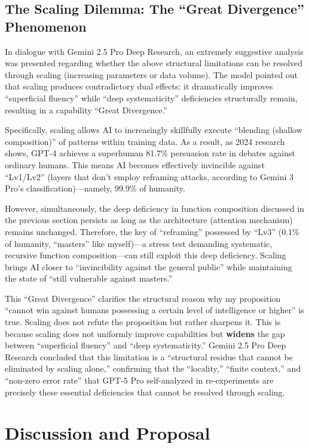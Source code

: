 \documentclass[11pt, a4paper]{article}
\begin{document}
\subsection{The Scaling Dilemma: The ``Great Divergence'' Phenomenon}
In dialogue with Gemini 2.5 Pro Deep Research, an extremely suggestive analysis was presented regarding whether the above structural limitations can be resolved through scaling (increasing parameters or data volume). The model pointed out that scaling produces contradictory dual effects: it dramatically improves ``superficial fluency'' while ``deep systematicity'' deficiencies structurally remain, resulting in a capability ``Great Divergence.''

Specifically, scaling allows AI to increasingly skillfully execute ``blending (shallow composition)'' of patterns within training data. As a result, as 2024 research shows, GPT-4 achieves a superhuman 81.7\% persuasion rate in debates against ordinary humans. This means AI becomes effectively invincible against ``Lv1/Lv2'' (layers that don't employ reframing attacks, according to Gemini 3 Pro's classification)—namely, 99.9\% of humanity.

However, simultaneously, the deep deficiency in function composition discussed in the previous section persists as long as the architecture (attention mechanism) remains unchanged. Therefore, the key of ``reframing'' possessed by ``Lv3'' (0.1\% of humanity, ``masters'' like myself)—a stress test demanding systematic, recursive function composition—can still exploit this deep deficiency. Scaling brings AI closer to ``invincibility against the general public'' while maintaining the state of ``still vulnerable against masters.''

This ``Great Divergence'' clarifies the structural reason why my proposition ``cannot win against humans possessing a certain level of intelligence or higher'' is true. Scaling does not refute the proposition but rather sharpens it. This is because scaling does not uniformly improve capabilities but \textbf{widens} the gap between ``superficial fluency'' and ``deep systematicity.'' Gemini 2.5 Pro Deep Research concluded that this limitation is a ``structural residue that cannot be eliminated by scaling alone,'' confirming that the ``locality,'' ``finite context,'' and ``non-zero error rate'' that GPT-5 Pro self-analyzed in re-experiments are precisely these essential deficiencies that cannot be resolved through scaling.

\section{Discussion and Proposal}
\end{document}

